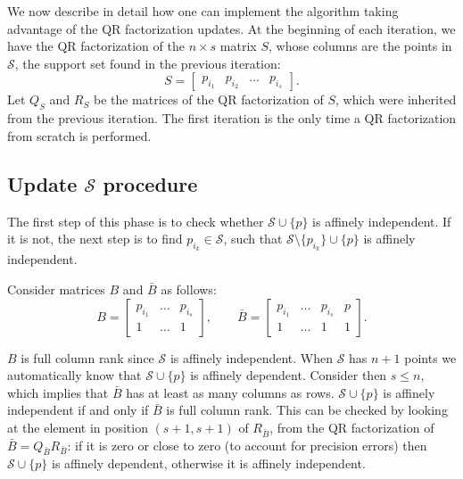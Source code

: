 \medskip

We now describe in detail how one can implement the algorithm taking advantage of  the QR factorization updates. At the beginning of each iteration, we have the QR factorization of the $n\times s$ matrix $S$, whose columns are the points in ${\mathcal{S}}$, the support set found in the previous iteration:
$$S =\left[\begin{array}{cccc} p_{i_1} &p_{i_2}&\dots&  p_{i_s}\end{array}\right].$$
Let $Q_S$ and $R_S$ be the matrices of the QR factorization of $S$, which were inherited from the previous iteration. The first iteration is the only time a QR factorization from scratch is performed. 

\subsection{Update ${\mathcal{S}}$ procedure}\label{subsec:app1}

The first step of this phase is to check whether ${\mathcal{S}}\cup \{{{p}}\}$ is affinely independent. If it is not, the next step is to find $p_{i_k}\in {\mathcal{S}}$, such that ${\mathcal{S}}\setminus\{p_{i_k}\} \cup \{{{p}}\}$ is affinely independent.

\smallskip

Consider matrices $B$ and $\bar{B}$ as follows:
\begin{equation}\label{mat:B}
B = \left[\begin{array}{ccc}
p_{i_1}& \dots & p_{i_s}\\
1 & \dots &1
\end{array}\right], \quad\quad \bar{B} = \left[\begin{array}{cccc}
p_{i_1}& \dots & p_{i_s} & {{p}}\\
1 & \dots &1 & 1
\end{array}\right].
\end{equation}

\noindent $B$  is full column rank since ${\mathcal{S}}$ is affinely independent. When ${\mathcal{S}}$ has $n+1$ points we automatically know that ${\mathcal{S}}\cup \{{{p}}\}$ is affinely dependent. Consider then $s\leq n$, which implies that $\bar{B}$ has at least as many columns as rows. ${\mathcal{S}}\cup \{{{p}}\}$ is affinely independent if and only if $\bar{B}$ is full column rank. This can be checked by looking at the element in position $(s+1, s+1)$ of $R_{\bar{B}}$, from the QR factorization of $\bar{B}=Q_{\bar{B}}R_{\bar{B}}$: if it is zero or close to zero (to account for precision errors) then ${\mathcal{S}}\cup \{{{p}}\}$ is affinely dependent, otherwise it is affinely independent.

